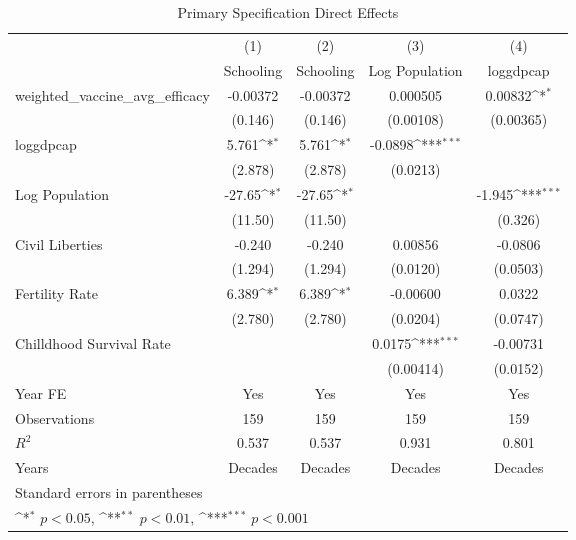 \begin{table}[htbp]\centering
\def\sym#1{\ifmmode^{#1}\else\(^{#1}\)\fi}
\caption{Primary Specification Direct Effects}
\begin{tabular}{l*{4}{c}}
\toprule
                &\multicolumn{1}{c}{(1)}&\multicolumn{1}{c}{(2)}&\multicolumn{1}{c}{(3)}&\multicolumn{1}{c}{(4)}\\
                &\multicolumn{1}{c}{Schooling}&\multicolumn{1}{c}{Schooling}&\multicolumn{1}{c}{Log Population}&\multicolumn{1}{c}{loggdpcap}\\
\midrule
weighted\_vaccine\_avg\_efficacy& -0.00372         & -0.00372         & 0.000505         &  0.00832\sym{*}  \\
                &  (0.146)         &  (0.146)         &(0.00108)         &(0.00365)         \\
\addlinespace
loggdpcap       &    5.761\sym{*}  &    5.761\sym{*}  &  -0.0898\sym{***}&                  \\
                &  (2.878)         &  (2.878)         & (0.0213)         &                  \\
\addlinespace
Log Population  &   -27.65\sym{*}  &   -27.65\sym{*}  &                  &   -1.945\sym{***}\\
                &  (11.50)         &  (11.50)         &                  &  (0.326)         \\
\addlinespace
Civil Liberties &   -0.240         &   -0.240         &  0.00856         &  -0.0806         \\
                &  (1.294)         &  (1.294)         & (0.0120)         & (0.0503)         \\
\addlinespace
Fertility Rate  &    6.389\sym{*}  &    6.389\sym{*}  & -0.00600         &   0.0322         \\
                &  (2.780)         &  (2.780)         & (0.0204)         & (0.0747)         \\
\addlinespace
Chilldhood Survival Rate&                  &                  &   0.0175\sym{***}& -0.00731         \\
                &                  &                  &(0.00414)         & (0.0152)         \\
\addlinespace
Year FE         &      Yes         &      Yes         &      Yes         &      Yes         \\
\midrule
Observations    &      159         &      159         &      159         &      159         \\
\(R^{2}\)       &    0.537         &    0.537         &    0.931         &    0.801         \\
Years           &  Decades         &  Decades         &  Decades         &  Decades         \\
\bottomrule
\multicolumn{5}{l}{\footnotesize Standard errors in parentheses}\\
\multicolumn{5}{l}{\footnotesize \sym{*} \(p<0.05\), \sym{**} \(p<0.01\), \sym{***} \(p<0.001\)}\\
\end{tabular}
\end{table}
